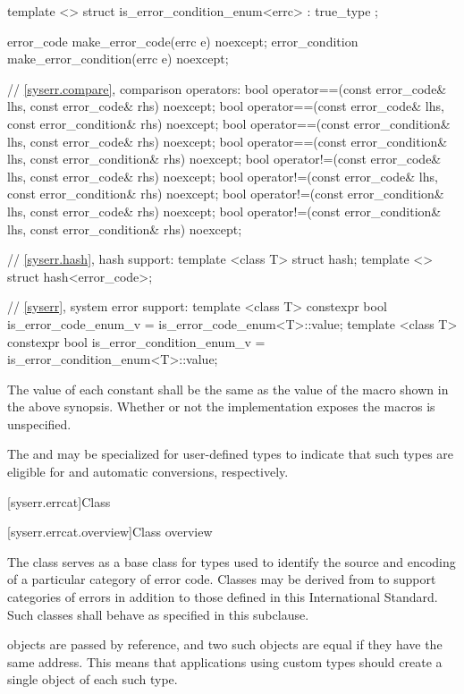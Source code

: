 \begin{codeblock}
{  template <> struct is_error_condition_enum<errc> : true_type {};

  error_code make_error_code(errc e) noexcept;
  error_condition make_error_condition(errc e) noexcept;

  // \ref{syserr.compare}, comparison operators:
  bool operator==(const error_code& lhs, const error_code& rhs) noexcept;
  bool operator==(const error_code& lhs, const error_condition& rhs) noexcept;
  bool operator==(const error_condition& lhs, const error_code& rhs) noexcept;
  bool operator==(const error_condition& lhs, const error_condition& rhs) noexcept;
  bool operator!=(const error_code& lhs, const error_code& rhs) noexcept;
  bool operator!=(const error_code& lhs, const error_condition& rhs) noexcept;
  bool operator!=(const error_condition& lhs, const error_code& rhs) noexcept;
  bool operator!=(const error_condition& lhs, const error_condition& rhs) noexcept;

  // \ref{syserr.hash}, hash support:
  template <class T> struct hash;
  template <> struct hash<error_code>;

  // \ref{syserr}, system error support:
  template <class T> constexpr bool is_error_code_enum_v
    = is_error_code_enum<T>::value;
  template <class T> constexpr bool is_error_condition_enum_v
    = is_error_condition_enum<T>::value;
}
\end{codeblock}

\pnum The value of each  constant shall be the same as
the value of the  macro shown in the above synopsis. Whether
or not the  implementation exposes the 
macros is unspecified.

\pnum
The  and  may be
specialized for user-defined types to indicate that such types are eligible
for  and  automatic
conversions, respectively.

[syserr.errcat]{Class }

[syserr.errcat.overview]{Class  overview}

\pnum
The class  serves as a base class for types used
to identify the source and encoding of a particular category of error code.
Classes may be derived from  to support
categories of errors in addition to those defined in this International
Standard.
Such classes shall behave as specified in this
subclause. \begin{note}  objects are
passed by reference, and two such objects
are equal if they have the same address. This means that applications using
custom  types should create a single object of each
such type. \end{note}

